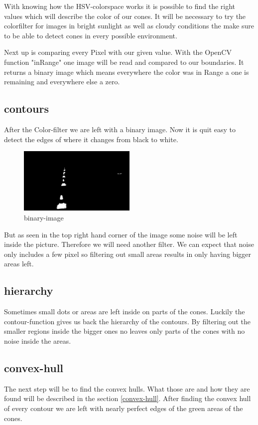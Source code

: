 \documentclass[10pt,a4paper]{article}
\begin{document}
	With knowing how the HSV-colorspace works it is possible to find the right values which will describe the color of our cones. It will be necessary to try the colorfilter for images in bright sunlight as well as cloudy conditions the make sure to be able to detect cones in every possible environment.
	
	Next up is comparing every Pixel with our given value. With the OpenCV function "inRange" one image will be read and compared to our boundaries. It returns a binary image which means everywhere the color was in Range a one is remaining and everywhere else a zero.
	
	\subsection{contours}
	After the Color-filter we are left with a binary image. Now it is quit easy to detect the edges of where it changes from black to white.
	
	\begin{figure}[h]
		\centering
		\includegraphics[width=0.5\textwidth]{Abb/mask.png}
		\caption{binary-image}
		\label{binary-image}
	\end{figure}
	
	But as seen in the top right hand corner of the image some noise will be left inside the picture. Therefore we will need another filter. We can expect that noise only includes a few pixel so filtering out small areas results in only having bigger areas left.
	
	\subsection{hierarchy}
	Sometimes small dots or areas are left inside on parts of the cones. Luckily the contour-function gives us back the hierarchy of the contours. By filtering out the smaller regions inside the bigger ones no leaves only parts of the cones with no noise inside the areas.
	
	\subsection{convex-hull}
	The next step will be to find the convex hulls. What those are and how they are found will be described in the section \ref{convex-hull}. After finding the convex hull of every contour we are left with nearly perfect edges of the green areas of the cones. 
	
\end{document}
